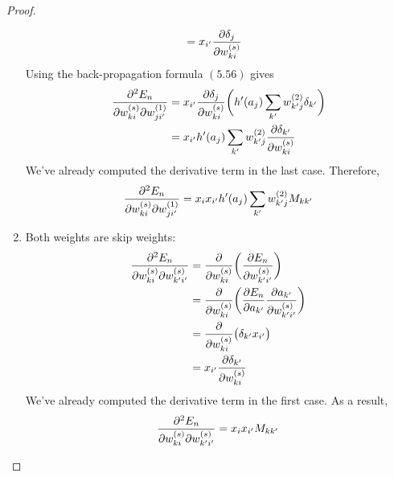 \begin{proof}
\begin{enumerate}
\begin{align*}
                &= x_{i'} \pdv{\delta_j}{w_{ki}^{(s)}} 
            \end{align*}
            Using the back-propagation formula $(5.56)$ gives
            \begin{align*}
                \pdv{E_n}{w_{ki}^{(s)}}{w_{ji'}^{(1)}}
                &= x_{i'} \pdv{\delta_j}{w_{ki}^{(s)}}\bigg(h'(a_j) \sum_{k'} w_{k'j}^{(2)} \delta_{k'}\bigg)  \\
                &= x_{i'} h'(a_j) \sum_{k'} w_{k'j}^{(2)} \pdv{\delta_{k'}}{w_{ki}^{(s)}} 
            \end{align*}
            We've already computed the derivative term in the last case. Therefore,
            \[
                \pdv{E_n}{w_{ki}^{(s)}}{w_{ji'}^{(1)}}
                = x_i x_{i'} h'(a_j) \sum_{k'} w_{k' j}^{(2)} M_{kk'}
            \] 
        \item Both weights are skip weights:
            \begin{align*}
                \pdv{E_n}{w_{ki}^{(s)}}{w_{k'i'}^{(s)}}
                &= \pdv{w_{ki}^{(s)}} \bigg(\pdv{E_n}{w_{k'i'}^{(s)}}\bigg) \\
                &= \pdv{w_{ki}^{(s)}} \bigg(\pdv{E_n}{a_{k'}} \pdv{a_{k'}}{w_{k'i'}^{(s)}}\bigg) \\
                &= \pdv{w_{ki}^{(s)}} \big(\delta_{k'} x_{i'}\big) \\
                &= x_{i'} \pdv{\delta_{k'}}{w_{ki}^{(s)}} 
            \end{align*}
            We've already computed the derivative term in the first case. As a result,
            \[
                \pdv{E_n}{w_{ki}^{(s)}}{w_{k'i'}^{(s)}}
                = x_{i} x_{i'} M_{kk'}
            \] 
    \end{enumerate}
\end{proof}
